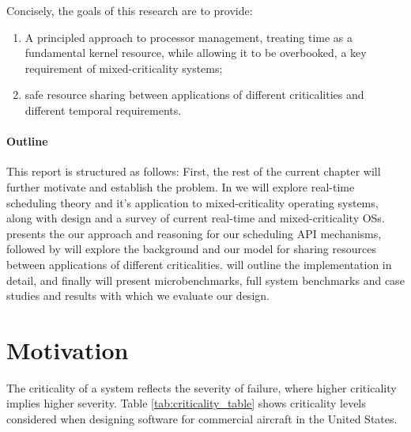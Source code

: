 Concisely, the goals of this research are to provide:
\begin{enumerate}[label=\textbf{G\arabic*}]
\item A principled approach to processor management, treating time as a fundamental kernel resource, while allowing it to be overbooked, a key requirement of mixed-criticality systems;
\item safe resource sharing between applications of different criticalities and different temporal requirements. 
\end{enumerate}

\paragraph{Outline}

This report is structured as follows:
First, the rest of the current chapter will further motivate and establish the problem.
In  we will explore real-time scheduling theory and it's application to mixed-criticality operating systems, along with \selfour design and a survey of current real-time and mixed-criticality \glspl{OS}.
 presents the our approach and reasoning for our scheduling API mechanisms, 
followed by  will explore the background and our model for sharing resources between applications of different criticalities. 
 will outline the implementation in detail, and finally
 will present microbenchmarks, full system benchmarks and case studies and results with which we evaluate our design.

\section{Motivation}
\label{sec:motivation}

The criticality of a system reflects the severity of failure, where higher criticality implies higher severity.
Table \ref{tab:criticality_table} shows criticality levels considered when designing software for commercial aircraft in the United States.

